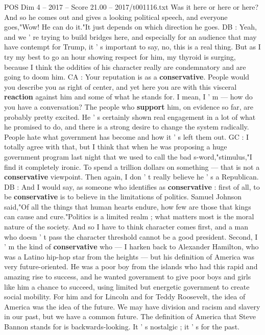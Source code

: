 \begin{textsample}{POS Dim 4 – 2017 – Score 21.00 – 2017/t001116.txt}
Was it here or here or here?
And so he comes out and gives a looking political speech, and everyone goes,"Wow!
He can do it."It just depends on which direction he goes.
DB : Yeah, and we ' re trying to build bridges here, and especially for an audience that may have contempt for Trump, it ' s important to say, no, this is a real thing.
But as I try my best to go an hour showing respect for him, my thyroid is surging, because I think the oddities of his character really are condemnatory and are going to doom him.
CA : Your reputation is as a \textbf{conservative}.
People would you describe you as right of center, and yet here you are with this visceral \textbf{reaction} against him and some of what he stands for.
I mean, I ' m — how do you have a conversation?
The people who \textbf{support} him, on evidence so far, are probably pretty excited.
He ' s certainly shown real engagement in a lot of what he promised to do, and there is a strong desire to change the system radically.
People hate what government has become and how it ' s left them out.
GC : I totally agree with that, but I think that when he was proposing a huge government program last night that we used to call the bad s-word,"stimulus,"I find it completely ironic.
To spend a trillion dollars on something — that is not a \textbf{conservative} viewpoint.
Then again, I don ' t really believe he ' s a Republican.
DB : And I would say, as someone who identifies as \textbf{conservative} : first of all, to be \textbf{conservative} is to believe in the limitations of politics.
Samuel Johnson said,"Of all the things that human hearts endure, how few are those that kings can cause and cure."Politics is a limited realm ; what matters most is the moral nature of the society.
And so I have to think character comes first, and a man who doesn ' t pass the character threshold cannot be a good president.
Second, I ' m the kind of \textbf{conservative} who — I harken back to Alexander Hamilton, who was a Latino hip-hop star from the heights — but his definition of America was very future-oriented.
He was a poor boy from the islands who had this rapid and amazing rise to success, and he wanted government to give poor boys and girls like him a chance to succeed, using limited but energetic government to create social mobility.
For him and for Lincoln and for Teddy Roosevelt, the idea of America was the idea of the future.
We may have division and racism and slavery in our past, but we have a common future.
The definition of America that Steve Bannon stands for is backwards-looking.
It ' s nostalgic ; it ' s for the past.

\end{textsample}
